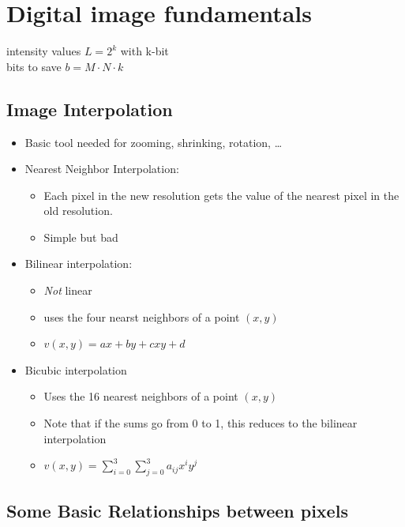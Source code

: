 \section{Digital image fundamentals }
  \begin{center}
    intensity values $L = 2^k$  with k-bit\\
    bits to save $b = M \cdot N \cdot k$ 
  \end{center}
\subsection{Image Interpolation }
\begin{itemize}
  \item Basic tool needed for zooming, shrinking, rotation, \ldots
  \item Nearest Neighbor Interpolation: 
	  \begin{itemize}
		  \item Each pixel in the new resolution gets the value of the nearest pixel in the old resolution.
		  \item Simple but bad
	\end{itemize}
  \item Bilinear interpolation:
  	\begin{itemize}
		\item \emph{Not} linear
  	  \item uses the four nearst neighbors of a point $(x,y)$
  	  \item $v(x,y) = ax + by + cxy + d$
  	\end{itemize}
  \item Bicubic interpolation
	\begin{itemize}
  	  \item Uses the 16 nearest neighbors of a point $(x,y)$
  	  \item Note that if the sums go from 0 to 1, this reduces to the bilinear interpolation
  	  \item $v(x,y) = \sum\limits_{i=0}^3\sum\limits_{j=0}^3 a_{ij}x^iy^j$
  	\end{itemize}
\end{itemize}


\subsection{Some Basic Relationships between pixels }
